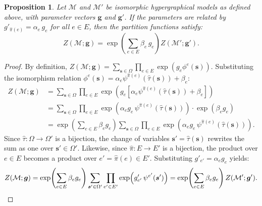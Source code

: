 \documentclass[11pt,reqno]{amsart}
\newcommand{\vecs}{\boldsymbol{s}}
\newcommand{\vecg}{\boldsymbol{g}}
\newcommand{\Mo}{\mathcal{M}}
\newcommand{\statespace}{\Omega}
\theoremstyle{plain}
\newtheorem{proposition}[theorem]{Proposition}
\theoremstyle{definition}
\numberwithin{equation}{section}
\begin{document}
\begin{proposition}
\label{prop:equivmodpart}
Let $\Mo$ and $\Mo'$ be isomorphic hypergraphical models as defined above, with parameter vectors $\vecg$ and $\vecg'$. If the parameters are related by $g'_{\hat{\pi}(e)} = \alpha_e\, g_e$ for all $e \in E$, then the partition functions satisfy:
\[
    Z(\Mo; \vecg) = \exp\!\left( \sum_{e \in E} \beta_e\, g_e \right) Z(\Mo'; \vecg').
\]
\end{proposition}
\begin{proof}
By definition, $Z(\Mo; \vecg) = \sum_{\vecs \in \statespace} \prod_{e \in E} \exp(g_e \phi^e(\vecs))$. Substituting the isomorphism relation $\phi^e(\vecs) = \alpha_e \psi^{\hat{\pi}(e)}(\hat{\tau}(\vecs)) + \beta_e$:
\begin{align*}
    Z(\Mo; \vecg) &= \sum_{\vecs \in \statespace} \prod_{e \in E} \exp\!\left( g_e \left[ \alpha_e \psi^{\hat{\pi}(e)}(\hat{\tau}(\vecs)) + \beta_e \right] \right) \\
    &= \sum_{\vecs \in \statespace} \prod_{e \in E} \exp\!\left( \alpha_e g_e \, \psi^{\hat{\pi}(e)}(\hat{\tau}(\vecs)) \right) \cdot \exp(\beta_e g_e) \\
    &= \exp\!\left( \sum_{e \in E} \beta_e g_e \right) \sum_{\vecs \in \statespace} \prod_{e \in E} \exp\!\left( \alpha_e g_e \, \psi^{\hat{\pi}(e)}(\hat{\tau}(\vecs)) \right).
\end{align*}
Since $\hat{\tau} \colon \statespace \to \statespace'$ is a bijection, the change of variables $\vecs' = \hat{\tau}(\vecs)$ rewrites the sum as one over $\vecs' \in \statespace'$. Likewise, since $\hat{\pi} \colon E \to E'$ is a bijection, the product over $e \in E$ becomes a product over $e' = \hat{\pi}(e) \in E'$. Substituting $g'_{e'} = \alpha_e g_e$ yields:
\[
    Z(\Mo; \vecg) = \exp\!\left( \sum_{e \in E} \beta_e g_e \right) \sum_{\vecs' \in \statespace'} \prod_{e' \in E'} \exp\!\left( g'_{e'} \, \psi^{e'}(\vecs') \right) = \exp\!\left( \sum_{e \in E} \beta_e g_e \right) Z(\Mo'; \vecg'). \qedhere
\]
\end{proof}
\end{document}
